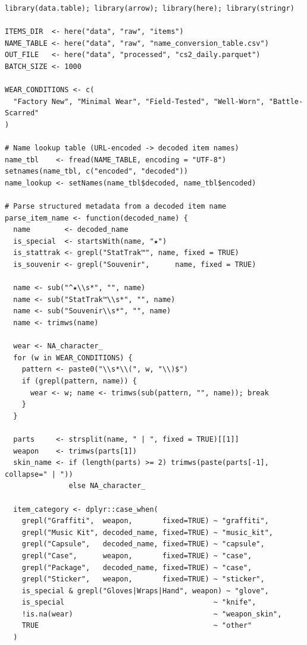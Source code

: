 \begin{lstlisting}[style=Rstyle, caption={Step 1: Data preprocessing and daily VWAP aggregation}]
library(data.table); library(arrow); library(here); library(stringr)

ITEMS_DIR  <- here("data", "raw", "items")
NAME_TABLE <- here("data", "raw", "name_conversion_table.csv")
OUT_FILE   <- here("data", "processed", "cs2_daily.parquet")
BATCH_SIZE <- 1000

WEAR_CONDITIONS <- c(
  "Factory New", "Minimal Wear", "Field-Tested", "Well-Worn", "Battle-Scarred"
)

# Name lookup table (URL-encoded -> decoded item names)
name_tbl    <- fread(NAME_TABLE, encoding = "UTF-8")
setnames(name_tbl, c("encoded", "decoded"))
name_lookup <- setNames(name_tbl$decoded, name_tbl$encoded)

# Parse structured metadata from a decoded item name
parse_item_name <- function(decoded_name) {
  name        <- decoded_name
  is_special  <- startsWith(name, "★")
  is_stattrak <- grepl("StatTrak™", name, fixed = TRUE)
  is_souvenir <- grepl("Souvenir",      name, fixed = TRUE)

  name <- sub("^★\\s*", "", name)
  name <- sub("StatTrak™\\s*", "", name)
  name <- sub("Souvenir\\s*", "", name)
  name <- trimws(name)

  wear <- NA_character_
  for (w in WEAR_CONDITIONS) {
    pattern <- paste0("\\s*\\(", w, "\\)$")
    if (grepl(pattern, name)) {
      wear <- w; name <- trimws(sub(pattern, "", name)); break
    }
  }

  parts     <- strsplit(name, " | ", fixed = TRUE)[[1]]
  weapon    <- trimws(parts[1])
  skin_name <- if (length(parts) >= 2) trimws(paste(parts[-1], collapse=" | "))
               else NA_character_

  item_category <- dplyr::case_when(
    grepl("Graffiti",  weapon,       fixed=TRUE) ~ "graffiti",
    grepl("Music Kit", decoded_name, fixed=TRUE) ~ "music_kit",
    grepl("Capsule",   decoded_name, fixed=TRUE) ~ "capsule",
    grepl("Case",      weapon,       fixed=TRUE) ~ "case",
    grepl("Package",   decoded_name, fixed=TRUE) ~ "case",
    grepl("Sticker",   weapon,       fixed=TRUE) ~ "sticker",
    is_special & grepl("Gloves|Wraps|Hand", weapon) ~ "glove",
    is_special                                   ~ "knife",
    !is.na(wear)                                 ~ "weapon_skin",
    TRUE                                         ~ "other"
  )


\end{lstlisting}
